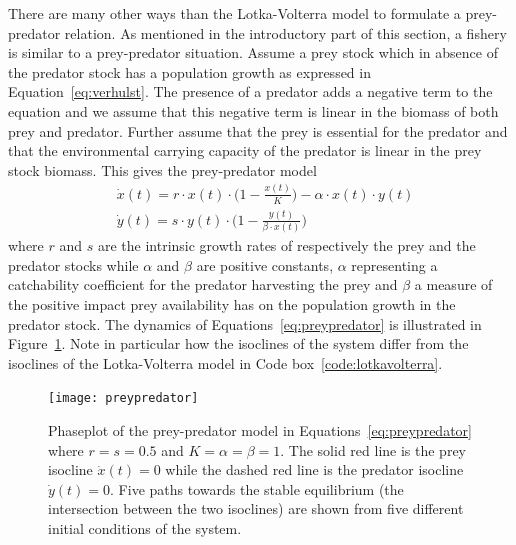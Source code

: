 \documentclass[11pt,fleqn]{book} %
\begin{document}
\hfill \break
{}There are many other ways than the Lotka-Volterra model to formulate a prey-predator relation. As mentioned in the introductory part of this section, a fishery is similar to a prey-predator situation. Assume a prey stock which in absence of the predator stock has a population growth as expressed in Equation~\ref{eq:verhulst}. The presence of a predator adds a negative term to the equation and we assume that this negative term is linear in the biomass of both prey and predator. Further assume that the prey is essential for the predator and that the environmental carrying capacity of the predator is linear in the prey stock biomass. This gives the prey-predator model
\begin{equation}
\label{eq:preypredator}
\begin{aligned} & \dot{x}(t) = r \cdot x(t) \cdot \bigg(1 - \frac{x(t)}{K}\bigg) - \alpha \cdot x(t) \cdot y(t)\\
& \dot{y}(t) = s \cdot y(t) \cdot \bigg(1 - \frac{y(t)}{\beta \cdot x(t)}\bigg)
\end{aligned}
\end{equation}
where $r$ and $s$ are the intrinsic growth rates of respectively the prey and the predator stocks while $\alpha$ and $\beta$ are positive constants, $\alpha$ representing a catchability coefficient for the predator harvesting the prey and $\beta$ a measure of the positive impact prey availability has on the population growth in the predator stock. The dynamics of Equations~\ref{eq:preypredator} is illustrated in Figure~\ref{fig:preypredator}. Note in particular how the isoclines of the system differ from the isoclines of the Lotka-Volterra model in Code box~\ref{code:lotkavolterra}.
\begin{figure}[ht]
\centering
\texttt{[image: preypredator]}
\caption{Phaseplot of the prey-predator model in Equations~\ref{eq:preypredator} where $r = s = 0.5$ and $K = \alpha = \beta = 1$. The solid red line is the prey isocline $ \dot{x}(t) = 0$ while the dashed red line is the predator isocline $ \dot{y}(t) = 0$. Five paths towards the stable equilibrium (the intersection between the two isoclines) are shown from five different initial conditions of the system.}
\label{fig:preypredator}
\end{figure}
\end{document}
